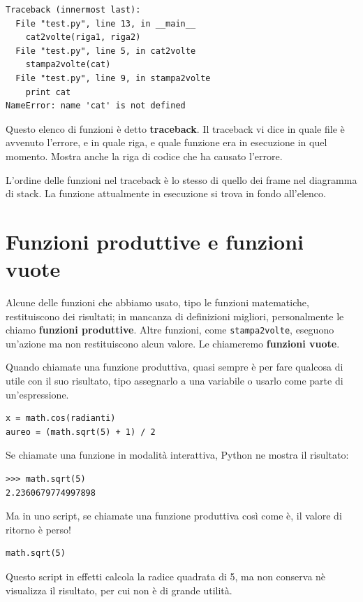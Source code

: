 \documentclass[10pt]{book}
\begin{document}
\begin{verbatim}
Traceback (innermost last):
  File "test.py", line 13, in __main__
    cat2volte(riga1, riga2)
  File "test.py", line 5, in cat2volte
    stampa2volte(cat)
  File "test.py", line 9, in stampa2volte
    print cat
NameError: name 'cat' is not defined
\end{verbatim}
%
Questo elenco di funzioni è detto {\bf traceback}. Il traceback vi dice in quale file è avvenuto l'errore, e in quale riga, e quale funzione era in esecuzione in quel momento. Mostra anche la riga di codice che ha causato l'errore.

L'ordine delle funzioni nel traceback è lo stesso di quello dei frame nel diagramma di stack. La funzione attualmente in esecuzione si trova in fondo all'elenco.


\section{Funzioni produttive e funzioni vuote}

Alcune delle funzioni che abbiamo usato, tipo le funzioni matematiche, restituiscono dei risultati; in mancanza di definizioni migliori, personalmente le chiamo {\bf funzioni produttive}.  Altre funzioni, come \verb"stampa2volte", eseguono un'azione ma non restituiscono alcun valore. Le chiameremo {\bf funzioni vuote}.

Quando chiamate una funzione produttiva, quasi sempre è per fare qualcosa di utile con il suo risultato, tipo assegnarlo a una variabile o usarlo come parte di un'espressione.

\begin{verbatim}
x = math.cos(radianti)
aureo = (math.sqrt(5) + 1) / 2
\end{verbatim}
%
Se chiamate una funzione in modalità interattiva, Python ne mostra il risultato:

\begin{verbatim}
>>> math.sqrt(5)
2.2360679774997898
\end{verbatim}
%
Ma in uno script, se chiamate una funzione produttiva così come è, il valore di ritorno è perso!

\begin{verbatim}
math.sqrt(5)
\end{verbatim}
%
Questo script in effetti calcola la radice quadrata di 5, ma non conserva nè visualizza il risultato, per cui non è di grande utilità.
\end{document}
